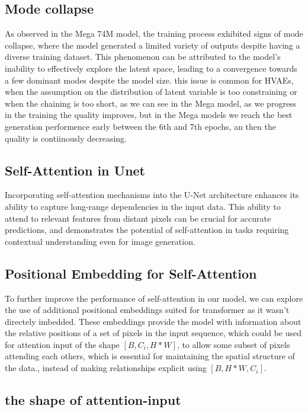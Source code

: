 \documentclass[twocolumn,superscriptaddress,aps]{revtex4-1}
\begin{document}
\subsection{Mode collapse}
As observed in the Mega 74M model, the training process exhibited signs of mode collapse, where the model generated a limited variety of outputs despite having a diverse training dataset. This phenomenon can be attributed to the model's inability to effectively explore the latent space, leading to a convergence towards a few dominant modes despite the model size.
this issue is common for HVAEs, when the assumption on the distribution of latent variable is too constraining or when the chaining is too short, as we can see in the Mega model, as we progress in the training the quality improves, but in the Mega models we reach the best generation performence early between the 6th and 7th epochs, an then the quality is contiinously decreasing.

\subsection{Self-Attention in Unet}
Incorporating self-attention mechanisms into the U-Net architecture enhances its ability to capture long-range dependencies in the input data. This ability to attend to relevant features from distant pixels can be crucial for accurate predictions, and demonstrates the potential of self-attention in tasks requiring contextual understanding even for image generation.

\subsection{Positional Embedding for Self-Attention}
To further improve the performance of self-attention in our model, we can explore the use of additional positional embeddings suited for transformer as it wasn't directely imbedded. These embeddings provide the model with information about the relative positions of a set of pixels in the input sequence, which could be used for attention input of the shape $[B, C_i, H*W]$, to allow some subset of pixels attending each others, which is essential for maintaining the spatial structure of the data., instead of making relationships explicit using $[B, H*W, C_i]$.

\subsection{the shape of attention-input}
\end{document}
